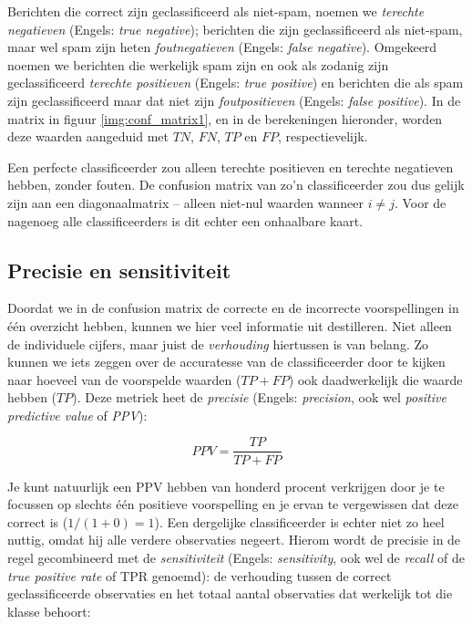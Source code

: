 Berichten die correct zijn geclassificeerd als niet-spam, noemen we \textit{terechte negatieven} (Engels: \textit{true negative}); berichten die zijn geclassificeerd als niet-spam, maar wel spam zijn heten \textit{foutnegatieven} (Engels: \textit{false negative}). Omgekeerd noemen we berichten die werkelijk spam zijn en ook als zodanig zijn geclassificeerd \textit{terechte positieven} (Engels: \textit{true positive}) en berichten die als spam zijn geclassificeerd maar dat niet zijn \textit{foutpositieven} (Engels: \textit{false positive}). In de matrix in figuur \ref{img:conf_matrix1}, en in de berekeningen hieronder, worden deze waarden aangeduid met $TN$, $FN$, $TP$ en $FP$, respectievelijk.

Een perfecte classificeerder zou alleen terechte positieven en terechte negatieven hebben, zonder fouten. De confusion matrix van zo'n classificeerder zou dus gelijk zijn aan een diagonaalmatrix – alleen niet-nul waarden wanneer $i \neq j$. Voor de nagenoeg alle classificeerders is dit echter een onhaalbare kaart.

\subsection{Precisie en sensitiviteit}
Doordat we in de confusion matrix de correcte en de incorrecte voorspellingen in één overzicht hebben, kunnen we hier veel informatie uit destilleren. Niet alleen de individuele cijfers, maar juist de \textit{verhouding} hiertussen is van belang. Zo kunnen we iets zeggen over de accuratesse van de classificeerder door te kijken naar hoeveel van de voorspelde waarden ($TP+FP$) ook daadwerkelijk die waarde hebben ($TP$). Deze metriek heet de \textit{precisie} (Engels: \textit{precision}, ook wel \textit{positive predictive value} of \textit{PPV}):

\[
  PPV = \frac{TP}{TP+FP}
\]

Je kunt natuurlijk een PPV hebben van honderd procent verkrijgen door je te focussen op slechts één positieve voorspelling en je ervan te vergewissen dat deze correct is ($1/(1+0)=1$). Een dergelijke classificeerder is echter niet zo heel nuttig, omdat hij alle verdere observaties negeert. Hierom wordt de precisie in de regel gecombineerd met de \textit{sensitiviteit} (Engels: \textit{sensitivity}, ook wel de \textit{recall} of de \textit{true positive rate} of TPR genoemd): de verhouding tussen de correct geclassificeerde observaties en het totaal aantal observaties dat werkelijk tot die klasse behoort:

